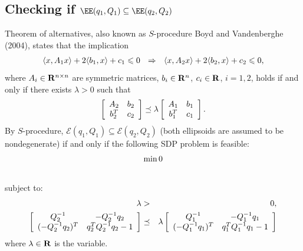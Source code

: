 \documentclass[letterpaper,10pt,english]{sphinxmanual}
\begin{document}
\subsection{Checking if $\EE(q_1,Q_1)\subseteq\EE(q_2,Q_2)$}
\label{chap_ellcalc:checking-if}
Theorem of alternatives, also known as $S$-procedure Boyd and
Vandenberghe (2004), states that the implication
\begin{gather}
\begin{split}\langle x, A_1x\rangle + 2\langle b_1,x\rangle + c_1 \leqslant0
~~ \Rightarrow ~~
\langle x, A_2x\rangle + 2\langle b_2,x\rangle + c_2 \leqslant0,\end{split}\notag
\end{gather}
where $A_i\in{\bf R}^{n\times n}$ are symmetric matrices,
$b_i\in{\bf R}^n$, $c_i\in{\bf R}$, $i=1,2$, holds if
and only if there exists $\lambda>0$ such that
\begin{gather}
\begin{split}\left[\begin{array}{cc}
A_2 & b_2\\
b_2^T & c_2\end{array}\right]
\preceq
\lambda\left[\begin{array}{cc}
A_1 & b_1\\
b_1^T & c_1\end{array}\right].\end{split}\notag
\end{gather}
By $S$-procedure,
${\mathcal E}(q_1,Q_1)\subseteq{\mathcal E}(q_2,Q_2)$ (both
ellipsoids are assumed to be nondegenerate) if and only if the following
SDP problem is feasible:
\begin{gather}
\begin{split}\min 0\end{split}\notag\\\begin{split}\end{split}\notag
\end{gather}
subject to:
\begin{gather}
\begin{split}\begin{aligned}
\lambda & > & 0, \\
\left[\begin{array}{cc}
Q_2^{-1} & -Q_2^{-1}q_2\\
(-Q_2^{-1}q_2)^T & q_2^TQ_2^{-1}q_2-1\end{array}\right]
& \preceq &
\lambda \left[\begin{array}{cc}
Q_1^{-1} & -Q_1^{-1}q_1\\
(-Q_1^{-1}q_1)^T & q_1^TQ_1^{-1}q_1-1\end{array}\right]\end{aligned}\end{split}\notag
\end{gather}
where $\lambda\in{\bf R}$ is the variable.
\end{document}

